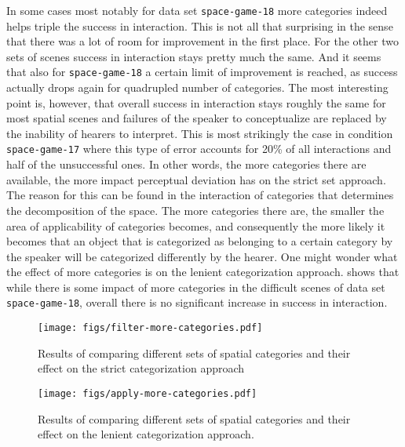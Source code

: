 In some cases most notably for data set {\footnotesize\tt space-game-18} 
more categories indeed helps triple the success in interaction. This is not all that
surprising in the sense that there was a lot of room for improvement in the 
first place. For the other two sets of scenes success in interaction stays 
pretty much the same. And it seems that also for {\footnotesize\tt space-game-18} a certain
limit of improvement is reached, as success actually drops again for quadrupled
number of categories. The most interesting point is, however, that overall 
success in interaction stays roughly the same for most spatial scenes 
and failures of the speaker to conceptualize
are replaced by the inability of hearers to interpret. This is most strikingly the case
in condition {\footnotesize\tt space-game-17} where this type of error accounts for 20\% of all
interactions and half of the unsuccessful ones. In other words, the more categories 
there are available, the more impact perceptual deviation has on the strict set approach.
The reason for this can be found in the interaction of categories that determines 
the decomposition of the space. The more categories there are, the smaller the 
area of applicability of categories
becomes, and consequently the more likely it becomes that an object that is
categorized as belonging to a certain category by the speaker will be 
categorized differently by the hearer. One might
wonder what the effect of more categories is on the lenient categorization
approach.  shows that while there
is some impact of more categories in the difficult scenes of data set
{\footnotesize\tt space-game-18}, overall there is no significant increase in success in
interaction.

\begin{figure}
	\begin{center}
		\texttt{[image: figs/filter-more-categories.pdf]}
	\end{center}
	\caption[Effect of additional categories on strict categorization]
	{Results of comparing different sets of spatial categories and their 
		effect on the strict categorization approach}
	\label{f:filter-increased-categories}
\end{figure}
\begin{figure}
	\begin{center}
		\texttt{[image: figs/apply-more-categories.pdf]}
	\end{center}
	\caption[Effect of additional categories on lenient categorization]
	{Results of comparing different sets of spatial categories and their 
		effect on the lenient categorization approach.}
	\label{f:apply-increased-categories}
\end{figure}

